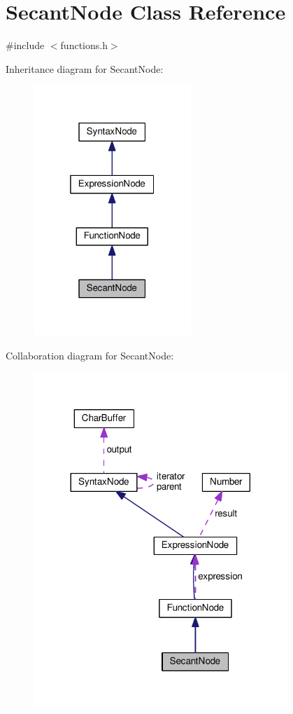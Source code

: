 \hypertarget{classSecantNode}{}\section{Secant\+Node Class Reference}
\label{classSecantNode}


{\ttfamily \#include $<$functions.\+h$>$}



Inheritance diagram for Secant\+Node\+:\nopagebreak
\begin{figure}[H]
\begin{center}
\leavevmode
\includegraphics[width=169pt]{classSecantNode__inherit__graph}
\end{center}
\end{figure}


Collaboration diagram for Secant\+Node\+:\nopagebreak
\begin{figure}[H]
\begin{center}
\leavevmode
\includegraphics[width=272pt]{classSecantNode__coll__graph}
\end{center}
\end{figure}
